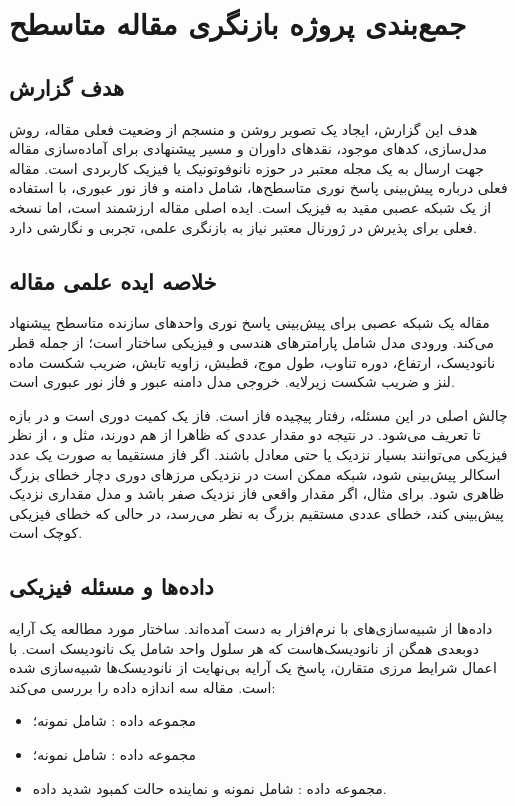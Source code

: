 \chapter{جمع‌بندی پروژه بازنگری مقاله متاسطح}

\section{هدف گزارش}
هدف این گزارش، ایجاد یک تصویر روشن و منسجم از وضعیت فعلی مقاله، روش مدل‌سازی، کدهای موجود، نقدهای داوران و مسیر پیشنهادی برای آماده‌سازی مقاله جهت ارسال به یک مجله معتبر در حوزه نانوفوتونیک یا فیزیک کاربردی است. مقاله فعلی درباره پیش‌بینی پاسخ نوری متاسطح‌ها، شامل دامنه و فاز نور عبوری، با استفاده از یک شبکه عصبی مقید به فیزیک است. ایده اصلی مقاله ارزشمند است، اما نسخه فعلی برای پذیرش در ژورنال معتبر نیاز به بازنگری علمی، تجربی و نگارشی دارد.



\section{خلاصه ایده علمی مقاله}
مقاله یک شبکه عصبی برای پیش‌بینی پاسخ نوری واحدهای سازنده متاسطح پیشنهاد می‌کند. ورودی مدل شامل پارامترهای هندسی و فیزیکی ساختار است؛ از جمله قطر نانودیسک، ارتفاع، دوره تناوب، طول موج، قطبش، زاویه تابش، ضریب شکست ماده لنز و ضریب شکست زیرلایه. خروجی مدل دامنه عبور و فاز نور عبوری است.

چالش اصلی در این مسئله، رفتار پیچیده فاز است. فاز یک کمیت دوری است و در بازه  تا \lr{$2\pi$} تعریف می‌شود. در نتیجه دو مقدار عددی که ظاهرا از هم دورند، مثل  و \lr{$2\pi$}، از نظر فیزیکی می‌توانند بسیار نزدیک یا حتی معادل باشند. اگر فاز مستقیما به صورت یک عدد اسکالر پیش‌بینی شود، شبکه ممکن است در نزدیکی مرزهای دوری دچار خطای بزرگ ظاهری شود. برای مثال، اگر مقدار واقعی فاز نزدیک صفر باشد و مدل مقداری نزدیک \lr{$2\pi$} پیش‌بینی کند، خطای عددی مستقیم بزرگ به نظر می‌رسد، در حالی که خطای فیزیکی کوچک است.

\section{داده‌ها و مسئله فیزیکی}
داده‌ها از شبیه‌سازی‌های  با نرم‌افزار  به دست آمده‌اند. ساختار مورد مطالعه یک آرایه دوبعدی همگن از نانودیسک‌هاست که هر سلول واحد شامل یک نانودیسک است. با اعمال شرایط مرزی متقارن، پاسخ یک آرایه بی‌نهایت از نانودیسک‌ها شبیه‌سازی شده است. مقاله سه اندازه داده را بررسی می‌کند:

\begin{itemize}
	\item مجموعه داده : شامل  نمونه؛
	\item مجموعه داده : شامل  نمونه؛
	\item مجموعه داده : شامل  نمونه و نماینده حالت کمبود شدید داده.
\end{itemize}


